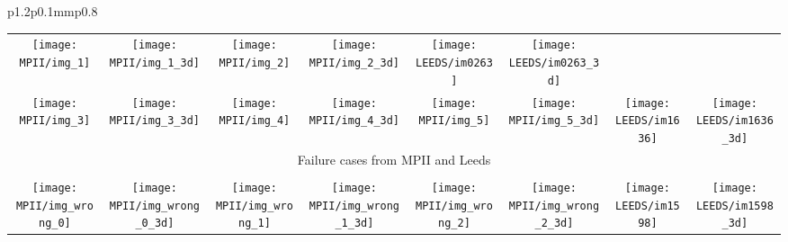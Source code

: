 \documentclass[10pt,twocolumn,letterpaper]{article}
\begin{document}
\begin{figure*}[tbp]
\begin{tabular}{p{}p{0.1mm}p{}}
\begin{center}
\begin{tabular}{cccccccc}
\texttt{[image: MPII/img\_1]}    & 
\texttt{[image: MPII/img\_1\_3d]} & 
\texttt{[image: MPII/img\_2]}    & 
\texttt{[image: MPII/img\_2\_3d]} &
\texttt{[image: LEEDS/im0263]}  &
\texttt{[image: LEEDS/im0263\_3d]} \\
\texttt{[image: MPII/img\_3]}    & 
\texttt{[image: MPII/img\_3\_3d]} & 
\texttt{[image: MPII/img\_4]}    & 
\texttt{[image: MPII/img\_4\_3d]} & 
\texttt{[image: MPII/img\_5]}    & 
\texttt{[image: MPII/img\_5\_3d]} &
\texttt{[image: LEEDS/im1636]} &
\texttt{[image: LEEDS/im1636\_3d]} \\


\multicolumn{8}{c}{Failure cases from MPII and Leeds}\\
\toprule
\\  
\texttt{[image: MPII/img\_wrong\_0]}    & 
\texttt{[image: MPII/img\_wrong\_0\_3d]} & 
\texttt{[image: MPII/img\_wrong\_1]}    & 
\texttt{[image: MPII/img\_wrong\_1\_3d]} & 
\texttt{[image: MPII/img\_wrong\_2]}    & 
\texttt{[image: MPII/img\_wrong\_2\_3d]} &
\texttt{[image: LEEDS/im1598]}    & 
\texttt{[image: LEEDS/im1598\_3d]} \\
\end{tabular}
\end{center}
\end{tabular}
\vspace{-5mm}
\caption{\small {\bf Left:} Results from the Human3.6M dataset. The identified 2D
  landmark positions and 3D skeleton is shown for each pose taken from
  different actions: Walking, Phoning, Greeting, Discussion, Sitting
  Down.\label{fig:Results} {\bf Right:} Results on images from the
  MPII~\cite{Andriluka:etal:CVPR:2014} (columns 1 to 3) and Leeds~\cite{Johnson10}
  datasets (last column). The  model was not trained on images as diverse as those contained in
  these datasets, however it often retrieves correct 2D and 3D joint positions. The last row
  shows example cases where the method fails either in the
  identification of 2D or 3D landmarks.\label{fig:Results_mpii}}\vspace{-5mm}
\end{figure*}
\end{document}
